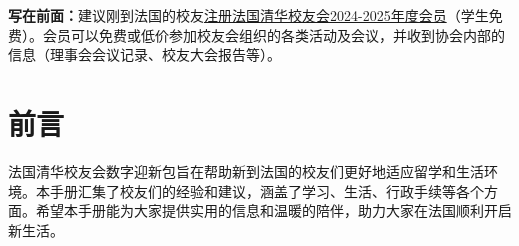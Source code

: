 \documentclass[UTF8]{ctexart}
\begin{document}
\begin{titlepage}
\begin{center}
        \vspace{1 cm} 

        \large{\textbf{写在前面：}建议刚到法国的校友\href{https://www.helloasso.com/associations/association-des-anciens-eleves-de-l-universite-tsi/adhesions/adhesion-2024-2025}{注册法国清华校友会2024-2025年度会员}（学生免费）。会员可以免费或低价参加校友会组织的各类活动及会议，并收到协会内部的信息（理事会会议记录、校友大会报告等）。}
      
    \end{center}
\setcounter{page}{0}
\end{titlepage}

\newpage
\section*{前言}
法国清华校友会数字迎新包旨在帮助新到法国的校友们更好地适应留学和生活环境。本手册汇集了校友们的经验和建议，涵盖了学习、生活、行政手续等各个方面。希望本手册能为大家提供实用的信息和温暖的陪伴，助力大家在法国顺利开启新生活。

\newpage
\tableofcontents

\fancyfoot[C]{\thepage}

\newpage


\newpage


\newpage


\newpage


\newpage


\newpage


\newpage


\newpage

\end{document}
